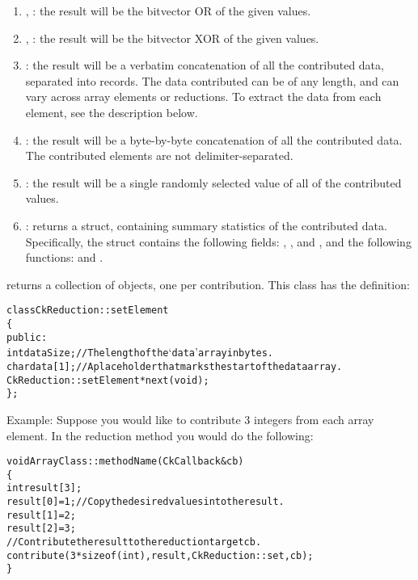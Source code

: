 \begin{enumerate}
\item {},  : the result will be the bitvector OR of the given
values.

\item {},  : the result will be the bitvector XOR of the given
values.

\item {} : the result will be a verbatim concatenation of
all the contributed data, separated into  records.
The data contributed can be of any length, and can vary across array elements
or reductions.  To extract the data from each element, see the description
below.

\item {} : the result will be a byte-by-byte
concatenation of all the contributed data.  The contributed elements
are not delimiter-separated.

\item {} : the result will be a single randomly
selected value of all of the contributed values.

\item {} : returns
a  struct, containing summary
statistics of the contributed data.  Specifically, the struct
contains the following fields: , , and , and the following functions:  and .

\end{enumerate}

 returns a collection of 
objects, one per contribution.  This class has the definition:

\begin{alltt}
class CkReduction::setElement 
\{
public:
  int dataSize; //The length of the `data' array in bytes.
  char data[1]; //A place holder that marks the start of the data array.
  CkReduction::setElement *next(void);
\};
\end{alltt}

Example: Suppose you would like to contribute 3 integers from each array
element. In the reduction method you would do the following:

\begin{alltt}
void ArrayClass::methodName (CkCallback &cb)
\{
  int result[3];
  result[0] = 1;            // Copy the desired values into the result.
  result[1] = 2;
  result[2] = 3;
  // Contribute the result to the reductiontarget cb.
  contribute(3*sizeof(int), result, CkReduction::set, cb);
\}
\end{alltt}


